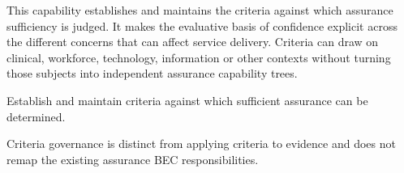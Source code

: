 This capability establishes and maintains the criteria against which assurance sufficiency is judged. It makes the evaluative basis of confidence explicit across the different concerns that can affect service delivery. Criteria can draw on clinical, workforce, technology, information or other contexts without turning those subjects into independent assurance capability trees.



Establish and maintain criteria against which sufficient assurance can be determined.



Criteria governance is distinct from applying criteria to evidence and does not remap the existing assurance BEC responsibilities.


